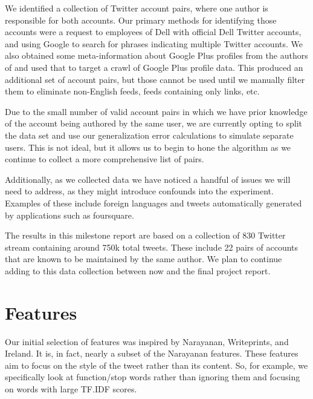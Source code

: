 \documentclass[10pt, conference, compsocconf]{IEEEtran}
\begin{document}
We identified a collection of Twitter account pairs, where one author
is responsible for both accounts. Our primary methods for identifying
those accounts were a request to employees of Dell with official Dell
Twitter accounts, and using Google to search for phrases indicating
multiple Twitter accounts. We also obtained some meta-information
about Google Plus profiles from the authors of \cite{Perito} and used that to
target a crawl of Google Plus profile data. This produced an
additional set of account pairs, but those cannot be used until we
manually filter them to eliminate non-English feeds, feeds containing
only links, etc.

Due to the small number of valid account pairs in which we have prior
knowledge of the account being authored by the same user, we are
currently opting to split the data set and use our generalization
error calculations to simulate separate users. This is not ideal, but
it allows us to begin to hone the algorithm as we continue to collect
a more comprehensive list of pairs.

Additionally, as we collected data we have noticed a handful of issues
we will need to address, as they might introduce confounds into the
experiment. Examples of these include foreign languages and tweets
automatically generated by applications such as foursquare.

The results in this milestone report are based on a collection of 830
Twitter stream containing around 750k total tweets. These include 22
pairs of accounts that are known to be maintained by the same
author. We plan to continue adding to this data collection between now
and the final project report.

\section{Features}

Our initial selection of features was inspired by
Narayanan\cite{Narayanan}, Writeprints\cite{Abbasi}, and
Ireland\cite{Ireland}. It is, in fact, nearly a subset of the
Narayanan features. These features aim to focus on the style of the
tweet rather than its content. So, for example, we specifically look
at function/stop words rather than ignoring them and focusing on words
with large TF.IDF scores.
\end{document}
